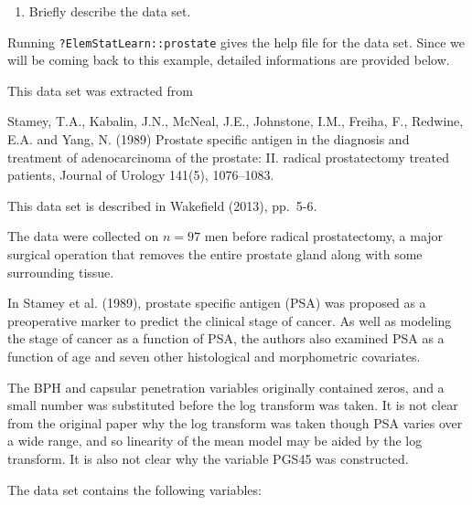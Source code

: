 \documentclass[]{book}
\providecommand{\tightlist}{%
  \setlength{\itemsep}{0pt}\setlength{\parskip}{0pt}}
\renewenvironment{quote}{\begin{VF}}{\end{VF}}
\theoremstyle{definition}
\theoremstyle{definition}
\theoremstyle{definition}
\theoremstyle{remark}
\begin{document}
\begin{enumerate}
\def\labelenumi{\alph{enumi}.}
\tightlist
\item
  Briefly describe the data set.
\end{enumerate}

Running \texttt{?ElemStatLearn::prostate} gives the help file for the
data set. Since we will be coming back to this example, detailed
informations are provided below.

This data set was extracted from

\begin{quote}
Stamey, T.A., Kabalin, J.N., McNeal, J.E., Johnstone, I.M., Freiha, F.,
Redwine, E.A. and Yang, N. (1989) Prostate specific antigen in the
diagnosis and treatment of adenocarcinoma of the prostate: II. radical
prostatectomy treated patients, Journal of Urology 141(5), 1076--1083.
\end{quote}

This data set is described in Wakefield (2013), pp.~5-6.

\begin{quote}
The data were collected on \(n=97\) men before radical prostatectomy, a
major surgical operation that removes the entire prostate gland along
with some surrounding tissue.
\end{quote}

\begin{quote}
In Stamey et al. (1989), prostate specific antigen (PSA) was proposed as
a preoperative marker to predict the clinical stage of cancer. As well
as modeling the stage of cancer as a function of PSA, the authors also
examined PSA as a function of age and seven other histological and
morphometric covariates.
\end{quote}

\begin{quote}
The BPH and capsular penetration variables originally contained zeros,
and a small number was substituted before the log transform was taken.
It is not clear from the original paper why the log transform was taken
though PSA varies over a wide range, and so linearity of the mean model
may be aided by the log transform. It is also not clear why the variable
PGS45 was constructed.
\end{quote}

The data set contains the following variables:
\end{document}
